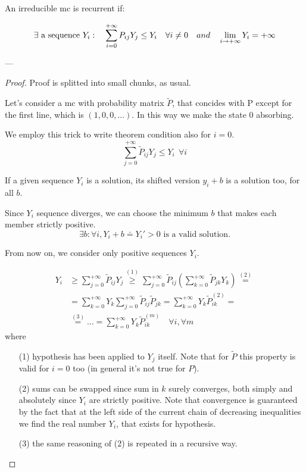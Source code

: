 	\begin{theorem}
		An irreducible \gls{mc} is recurrent if:

		\begin{equation}\noindent
			\exists \text{ a sequence } Y_i : \quad
 			\sum\limits_{i=0}^{+\infty} P_{ij} Y_j \le Y_i \quad \forall i \neq 0 \quad and \quad
 			\lim\limits_{i \to +\infty} Y_i = +\infty
		\end{equation}
	\end{theorem}
	---
	\begin{proof}
		Proof is splitted into small chunks, as usual.

		\proofpart
			Let's consider a \gls{mc} with probability matrix $\tilde{P}$, that concides with P except for the first line, which is $(1, 0, 0, ...)$.
			In this way we make the state 0 absorbing.

			We employ this trick to write theorem condition also for $i=0$.
			$$ \sum_{j=0}^{+\infty} \tilde{P}_{ij} Y_j \le Y_i ~~ \forall i$$

		\proofpart
			If a given sequence $Y_i$ is a solution, its shifted version $y_i + b$ is a solution too, for all $b$.

			Since $Y_i$ sequence diverges, we can choose the minimum $b$ that makes each member strictly positive.
			\begin{equation}
				\exists b: \forall i, Y_i + b \doteq Y_i' > 0 \text{ is a valid solution.}
			\end{equation}

			From now on, we consider only positive sequences $Y_i$.

		\proofpart
			\begin{equation}\begin{split}
				Y_i & \ge \sum_{j=0}^{+\infty} \tilde{P}_{ij} Y_j \stackrel{(1)}{\ge}
				\sum_{j=0}^{+\infty} \tilde{P}_{ij} \left( \sum_{k=0}^{+\infty} \tilde{P}_{jk} Y_k \right) \stackrel{(2)}{=} \\
				& = \sum_{k=0}^{+\infty} Y_k \sum_{j=0}^{+\infty} \tilde{P}_{ij}  \tilde{P}_{jk} =
				\sum_{k=0}^{+\infty} Y_k \tilde{P}_{ik}^{(2)} = \\
				& \stackrel{(3)}{=} \ldots = \sum_{k=0}^{+\infty} Y_k \tilde{P}_{ik}^{(m)} \quad\forall i,\forall m
			\end{split}\end{equation}
			where
			\begin{itemize}
				\item[(1)] hypothesis has been applied to $Y_j$ itself. Note that for $\tilde{P}$ this property is valid for $i=0$ too (in general it's not true for $P$).
				\item[(2)] sums can be swapped since sum in $k$ surely converges, both simply and absolutely since $Y_i$ are strictly positive. Note that convergence is guaranteed by the fact that at the left side of the current chain of decreasing inequalities we find the real number $Y_i$, that exists for hypothesis.
				\item[(3)] the same reasoning of (2) is repeated in a recursive way.
			\end{itemize}


\end{proof}
